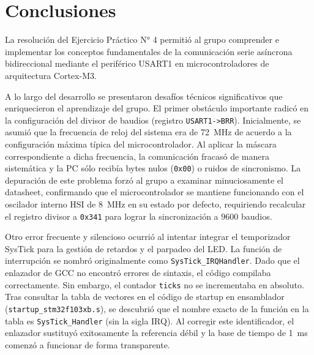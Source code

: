 \chapter{Conclusiones}
\label{ch:conclusiones}

La resolución del Ejercicio Práctico N° 4 permitió al grupo comprender e implementar los conceptos fundamentales
de la comunicación serie asíncrona bidireccional mediante el periférico USART1 en microcontroladores de arquitectura
Cortex-M3.

A lo largo del desarrollo se presentaron desafíos técnicos significativos que enriquecieron el aprendizaje del grupo.
El primer obstáculo importante radicó en la configuración del divisor de baudios (registro \lstinline{USART1->BRR}).
Inicialmente, se asumió que la frecuencia de reloj del sistema era de \qty{72}{\MHz} de acuerdo a la configuración
máxima típica del microcontrolador. Al aplicar la máscara correspondiente a dicha frecuencia, la comunicación
fracasó de manera sistemática y la PC sólo recibía bytes nulos (\texttt{0x00}) o ruidos de sincronismo. La depuración
de este problema forzó al grupo a examinar minuciosamente el datasheet, confirmando que el microcontrolador se mantiene funcionando con el oscilador interno
HSI de \qty{8}{\MHz} en su estado por defecto, requiriendo recalcular el registro divisor a \lstinline{0x341} para
lograr la sincronización a $9600$ baudios.

Otro error frecuente y silencioso ocurrió al intentar integrar el temporizador SysTick para la gestión de retardos y el
parpadeo del LED. La función de interrupción se nombró originalmente como \lstinline{SysTick_IRQHandler}. Dado que
el enlazador de GCC no encontró errores de sintaxis, el código compilaba correctamente. Sin embargo, el contador
\lstinline{ticks} no se incrementaba en absoluto. Tras consultar la tabla de vectores en el código de startup en
ensamblador (\texttt{startup\_stm32f103xb.s}), se descubrió que el nombre exacto de la función en la tabla es
\lstinline{SysTick_Handler} (sin la sigla IRQ). Al corregir este identificador, el enlazador sustituyó exitosamente la
referencia débil y la base de tiempo de \qty{1}{\ms} comenzó a funcionar de forma transparente.
